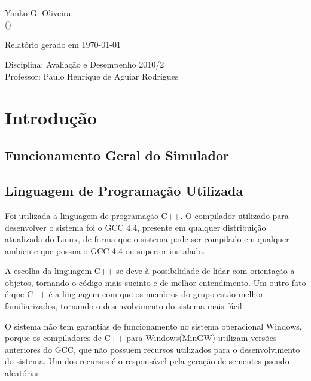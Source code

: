 \documentclass[a4paper,10pt]{article}
\begin{document}
\begin{titlepage}
\begin{center}
\_\_\_\_\_\_\_\_\_\_\_\_\_\_\_\_\_\_\_\_\_\_\_\_\_\_\_\_\_\_\_\_\_\_\_\_\_\_\_\\
Yanko G. Oliveira\\()\\

\vspace{0.5cm}

\vspace{1cm}

Relatório gerado em \today

\normalsize
\end{center}

\vfill

\begin{flushright}
Disciplina: Avaliação e Desempenho 2010/2\\
Professor: Paulo Henrique de Aguiar Rodrigues\\
\end{flushright}

\vspace{2cm}

\end{titlepage}

\pagebreak

\tableofcontents
\pagebreak

\section{Introdução}
\subsection{Funcionamento Geral do Simulador}
\subsection{Linguagem de Programação Utilizada}
    Foi utilizada a linguagem de programação C++. O compilador utilizado para desenvolver o sistema foi o GCC 4.4, presente em qualquer distribuição atualizada do Linux, de forma que o sistema pode ser compilado em qualquer ambiente que possua o GCC 4.4 ou superior instalado.
    
    A escolha da linguagem C++ se deve à possibilidade de lidar com orientação a objetos, tornando o código mais sucinto e de melhor entendimento. Um outro fato é que C++ é a linguagem com que os membros do grupo estão melhor familiarizados, tornando o desenvolvimento do sistema mais fácil.
    
    O sistema não tem garantias de funcionamento no sistema operacional Windows, porque os compiladores de C++ para Windows(MinGW) utilizam versões anteriores do GCC, que não possuem recursos utilizados para o desenvolvimento do sistema. Um dos recursos é o responsável pela geração de sementes pseudo-aleatórias.
\end{document}
